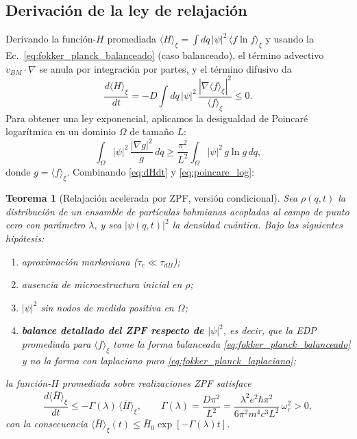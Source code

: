 \documentclass[11pt,a4paper]{article}
\newtheorem{theorem}{Teorema}
\begin{document}
\subsection{Derivación de la ley de relajación}
\label{sec:derivacion_relajacion}

Derivando la función-$H$ promediada $\langle H\rangle_\xi
=\int dq\,|\psi|^2\,\langle f\ln f\rangle_\xi$ y usando la
Ec.~\eqref{eq:fokker_planck_balanceado} (caso balanceado), el término
advectivo $v_{BM}\cdot\nabla$ se anula por integración por partes, y el
término difusivo da
\begin{equation}
\frac{d\langle H\rangle_\xi}{dt}
= -D\int dq\,|\psi|^2\,
\frac{|\nabla\langle f\rangle_\xi|^2}{\langle f\rangle_\xi}\leq 0.
\label{eq:dHdt}
\end{equation}
Para obtener una ley exponencial, aplicamos la desigualdad de Poincaré
logarítmica en un dominio $\Omega$ de tamaño $L$:
\begin{equation}
\int_\Omega |\psi|^2\,\frac{|\nabla g|^2}{g}\,dq
\geq \frac{\pi^2}{L^2}\int_\Omega |\psi|^2\,g\ln g\,dq,
\label{eq:poincare_log}
\end{equation}
donde $g=\langle f\rangle_\xi$. Combinando \eqref{eq:dHdt} y
\eqref{eq:poincare_log}:

\begin{theorem}[Relajación acelerada por ZPF, versión condicional]
\label{th:relajacion}
Sea $\rho(q,t)$ la distribución de un ensamble de partículas bohmianas
acopladas al campo de punto cero con parámetro $\lambda$, y sea
$|\psi(q,t)|^2$ la densidad cuántica. Bajo las siguientes hipótesis:
\begin{enumerate}
\item[(i)] aproximación markoviana ($\tau_c\ll\tau_{dB}$);
\item[(ii)] ausencia de microestructura inicial en $\rho$;
\item[(iii)] $|\psi|^2$ sin nodos de medida positiva en $\Omega$;
\item[(iv)] \textbf{balance detallado del ZPF respecto de $|\psi|^2$},
es decir, que la EDP promediada para $\langle f\rangle_\xi$ tome la
forma balanceada \eqref{eq:fokker_planck_balanceado} y no la forma con
laplaciano puro \eqref{eq:fokker_planck_laplaciano};
\end{enumerate}
la función-$H$ promediada sobre realizaciones ZPF satisface
\begin{equation}
\frac{d\langle\bar{H}\rangle_\xi}{dt}
\leq -\Gamma(\lambda)\,\langle\bar{H}\rangle_\xi,
\qquad
\Gamma(\lambda) = \frac{D\pi^2}{L^2}
= \frac{\lambda^2 e^2 \hbar \pi^2}{6\pi^2 m^4 c^3 L^2}\,\omega_c^2 > 0,
\label{eq:teorema1}
\end{equation}
con la consecuencia $\langle\bar{H}\rangle_\xi(t)
\leq \bar{H}_0\exp[-\Gamma(\lambda)t]$.
\end{theorem}
\end{document}
